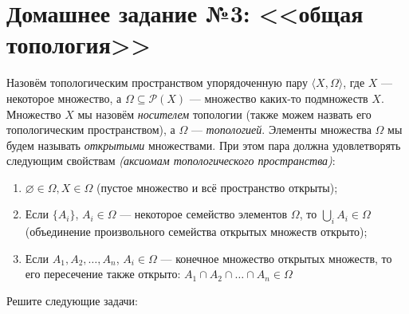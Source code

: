 \documentclass[10pt,a4paper,oneside]{article}
\begin{document}
\section*{Домашнее задание №3: <<общая топология>>}

Назовём топологическим пространством упорядоченную пару $\langle X, \Omega \rangle$, 
где $X$ --- некоторое множество, а $\Omega \subseteq \mathcal{P}(X)$ --- множество каких-то 
подмножеств $X$.
Множество $X$ мы назовём \emph{носителем} топологии (также можем назвать его топологическим 
пространством), а $\Omega$ --- \emph{топологией}.
Элементы множества $\Omega$ мы будем называть \emph{открытыми} множествами.
При этом пара должна удовлетворять следующим свойствам \emph{(аксиомам топологического пространства)}:

\begin{enumerate}
\item $\varnothing \in \Omega, X \in \Omega$ (пустое множество и всё пространство открыты);
\item Если $\{A_i\}$, $A_i \in \Omega$ --- некоторое семейство элементов $\Omega$,
то $\bigcup_i A_i \in \Omega$ (объединение произвольного семейства открытых множеств открыто);
\item Если $A_1, A_2, \dots, A_n$, $A_i \in \Omega$ --- конечное множество открытых множеств, 
то его пересечение также открыто: $A_1 \cap A_2 \cap \dots \cap A_n \in \Omega$
\end{enumerate}

Решите следующие задачи:
\end{document}
